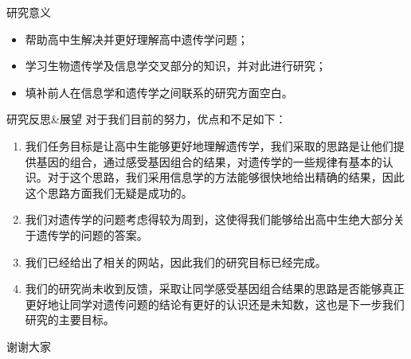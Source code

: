 \documentclass{beamer}
\begin{document}
	\begin{frame}{研究意义}
		\begin{itemize}
		\item 帮助高中生解决并更好理解高中遗传学问题；
		\item 学习生物遗传学及信息学交叉部分的知识，并对此进行研究；
		\item 填补前人在信息学和遗传学之间联系的研究方面空白。
		\end{itemize}
	\end{frame}

	\begin{frame}{研究反思\&展望}
		对于我们目前的努力，优点和不足如下：
		\begin{enumerate}
			\item 我们任务目标是让高中生能够更好地理解遗传学，我们采取的思路是让他们提供基因的组合，通过感受基因组合的结果，对遗传学的一些规律有基本的认识。对于这个思路，我们采用信息学的方法能够很快地给出精确的结果，因此这个思路方面我们无疑是成功的。
			\item 我们对遗传学的问题考虑得较为周到，这使得我们能够给出高中生绝大部分关于遗传学的问题的答案。
			\item 我们已经给出了相关的网站，因此我们的研究目标已经完成。
			\item 我们的研究尚未收到反馈，采取让同学感受基因组合结果的思路是否能够真正更好地让同学对遗传问题的结论有更好的认识还是未知数，这也是下一步我们研究的主要目标。
		\end{enumerate}
	\end{frame}

	\begin{frame}{}
		\centering \huge 谢谢大家
	\end{frame}
\end{document}
